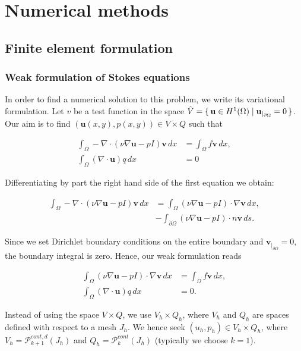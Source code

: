 \documentclass[11pt,a4paper,titlepage]{report}
\begin{document}
\chapter{Numerical methods}

\section{Finite element formulation}

\subsection{Weak formulation of Stokes equations}

In order to find a numerical solution to this problem, we write its variational formulation. Let $v$ be a test function in the space $\hat{V} = \set{\mathbf{u} \in H^1(\Omega) | \mathbf{u}_{|_{\partial \Omega}} = 0} $. Our aim is to find $(\mathbf{u}(x,y),p(x,y)) \in V \times Q$ such that

\begin{align}
\int_\Omega -\nabla \cdot (\nu \nabla \mathbf{u} - pI)\mathbf{v} \,dx &= \int_\Omega f \mathbf{v} \,dx, \\
\int_\Omega (\nabla \cdot \mathbf{u})q \,dx &= 0
\end{align}

Differentiating by part the right hand side of the first equation we obtain:

\begin{align}
\int_\Omega -\nabla \cdot (\nu \nabla \mathbf{u} - pI)\mathbf{v} \,dx &= \int_\Omega (\nu \nabla \mathbf{u} - pI) \cdot \nabla \mathbf{v} \,dx, \\
&- \int_{\partial \Omega} (\nu \nabla \mathbf{u} - pI) \cdot n \mathbf{v} \,ds.
\end{align}

Since we set Dirichlet boundary conditions on the entire boundary and $\mathbf{v}_{|_{\partial \Omega}} = 0$, the boundary integral is zero. Hence, our weak formulation reads

\begin{align}
\int_\Omega (\nu \nabla \mathbf{u} - pI) \cdot \nabla \mathbf{v} \,dx &= \int_\Omega f\mathbf{v} \,dx, \\
\int_\Omega (\nabla \cdot \mathbf{u}) q \,dx &= 0.
\end{align}

Instead of using the space $V \times Q$, we use $V_h \times Q_h$, where $V_h$ and $Q_h$ are spaces defined with respect to a mesh $J_h$. We hence seek $(u_h, p_h) \in V_h \times Q_h$, where $V_h = \mathcal{P}^{cont,d}_{k+1} (J_h)$ and $Q_h = \mathcal{P}^{cont}_{k} (J_h)$ (typically we choose $k=1$). \\
\end{document}
